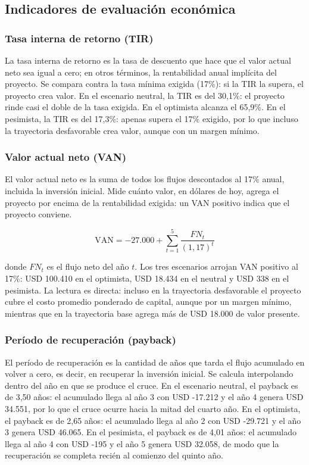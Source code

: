 \subsection{Indicadores de evaluación económica}

\subsubsection{Tasa interna de retorno (TIR)}

La tasa interna de retorno es la tasa de descuento que hace que el valor actual neto sea igual a cero; en otros términos, la rentabilidad anual implícita del proyecto. Se compara contra la tasa mínima exigida (17\%): si la TIR la supera, el proyecto crea valor. En el escenario neutral, la TIR es del 30,1\%: el proyecto rinde casi el doble de la tasa exigida. En el optimista alcanza el 65,9\%. En el pesimista, la TIR es del 17,3\%: apenas supera el 17\% exigido, por lo que incluso la trayectoria desfavorable crea valor, aunque con un margen mínimo.

\subsubsection{Valor actual neto (VAN)}

El valor actual neto es la suma de todos los flujos descontados al 17\% anual, incluida la inversión inicial. Mide cuánto valor, en dólares de hoy, agrega el proyecto por encima de la rentabilidad exigida: un VAN positivo indica que el proyecto conviene.

\begin{equation*}
\mathrm{VAN} = -27.000 + \sum_{t=1}^{5} \frac{FN_t}{(1{,}17)^t}
\end{equation*}

donde $FN_t$ es el flujo neto del año $t$. Los tres escenarios arrojan VAN positivo al 17\%: USD 100.410 en el optimista, USD 18.434 en el neutral y USD 338 en el pesimista. La lectura es directa: incluso en la trayectoria desfavorable el proyecto cubre el costo promedio ponderado de capital, aunque por un margen mínimo, mientras que en la trayectoria base agrega más de USD 18.000 de valor presente.

\subsubsection{Período de recuperación (payback)}

El período de recuperación es la cantidad de años que tarda el flujo acumulado en volver a cero, es decir, en recuperar la inversión inicial. Se calcula interpolando dentro del año en que se produce el cruce. En el escenario neutral, el payback es de 3,50 años: el acumulado llega al año 3 con USD -17.212 y el año 4 genera USD 34.551, por lo que el cruce ocurre hacia la mitad del cuarto año. En el optimista, el payback es de 2,65 años: el acumulado llega al año 2 con USD -29.721 y el año 3 genera USD 46.065. En el pesimista, el payback es de 4,01 años: el acumulado llega al año 4 con USD -195 y el año 5 genera USD 32.058, de modo que la recuperación se completa recién al comienzo del quinto año.

